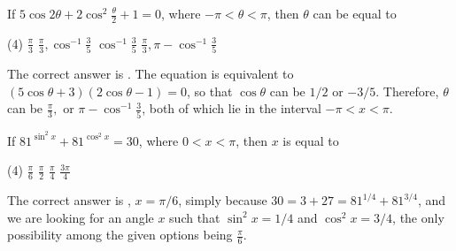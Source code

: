 \documentclass[12pt,a4paper]{memoir}
\theoremstyle{definition}
\newcommand{\correct}{
    \PrintSolutionsTF{%
        \ref{ans:\CurrentQuestionID}%
        }{%
        \label{ans:\CurrentQuestionID}%
        }%
}
\begin{document}
\begin{question}[name=1984 Roorkee]
	If $5\cos 2\theta + 2\cos^2 \frac{\theta}{2} + 1 = 0$, where $-\pi<\theta<\pi$, then $\theta$ can be equal to
	\begin{tasks}(4)
		\task $\displaystyle \frac{\pi}{3}$
		\task $\displaystyle \frac{\pi}{3}, \cos^{-1} \frac{3}{5}$
		\task $\displaystyle \cos^{-1} \frac{3}{5}$
		\task \correct $\displaystyle \frac{\pi}{3}, \pi-\cos^{-1} \frac{3}{5}$
	\end{tasks}
\end{question}
\begin{solution}
	The correct answer is \correct. The equation is equivalent to $(5\cos\theta + 3)(2\cos \theta -1)=0$, so that $\cos \theta$ can be $1/2$ or $-3/5$. Therefore, $\theta$ can be $\frac{\pi}{3},$ or  $\pi-\cos^{-1}\frac{3}{5}$, both of which lie in the interval $-\pi < x < \pi$.
\end{solution}




\begin{question}[name=2004 Karnataka CET]
	If $81^{\sin^2 x} + 81^{\cos^2 x}=30$, where $0<x<\pi$, then $x$ is equal to
	\begin{tasks}(4)
		\task \correct $\displaystyle \frac{\pi}{6}$
		\task $\displaystyle \frac{\pi}{2}$
		\task $\displaystyle \frac{\pi}{4}$
		\task $\displaystyle \frac{3\pi}{4}$
	\end{tasks}
\end{question}
\begin{solution}
	The correct answer is \correct, $x=\pi/6$, simply because $30=3+27 = 81^{1/4} + 81^{3/4}$, and we are looking for an angle $x$ such that $\sin^2 x = 1/4$ and $\cos^2 x = 3/4$, the only possibility among the given options being $\displaystyle \frac{\pi}{6}$.
\end{solution}
\end{document}

